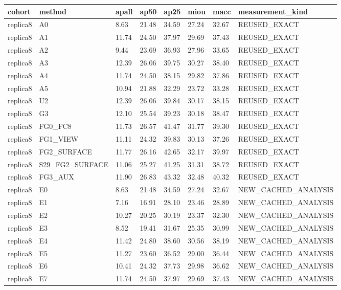 \begin{tabular}{llllllll}
\toprule
cohort & method & apall & ap50 & ap25 & miou & macc & measurement\_kind \\
\midrule
replica8 & A0 & 8.63 & 21.48 & 34.59 & 27.24 & 32.67 & REUSED\_EXACT \\
replica8 & A1 & 11.74 & 24.50 & 37.97 & 29.69 & 37.43 & REUSED\_EXACT \\
replica8 & A2 & 9.44 & 23.69 & 36.93 & 27.96 & 33.65 & REUSED\_EXACT \\
replica8 & A3 & 12.39 & 26.06 & 39.75 & 30.27 & 38.40 & REUSED\_EXACT \\
replica8 & A4 & 11.74 & 24.50 & 38.15 & 29.82 & 37.86 & REUSED\_EXACT \\
replica8 & A5 & 10.94 & 21.88 & 32.29 & 23.72 & 33.28 & REUSED\_EXACT \\
replica8 & U2 & 12.39 & 26.06 & 39.84 & 30.17 & 38.15 & REUSED\_EXACT \\
replica8 & G3 & 12.10 & 25.54 & 39.23 & 30.18 & 38.47 & REUSED\_EXACT \\
replica8 & FG0\_FC8 & 11.73 & 26.57 & 41.47 & 31.77 & 39.30 & REUSED\_EXACT \\
replica8 & FG1\_VIEW & 11.11 & 24.32 & 39.83 & 30.13 & 37.26 & REUSED\_EXACT \\
replica8 & FG2\_SURFACE & 11.77 & 26.16 & 42.65 & 32.17 & 39.97 & REUSED\_EXACT \\
replica8 & S29\_FG2\_SURFACE & 11.06 & 25.27 & 41.25 & 31.31 & 38.72 & REUSED\_EXACT \\
replica8 & FG3\_AUX & 11.90 & 26.83 & 43.32 & 32.48 & 40.32 & REUSED\_EXACT \\
replica8 & E0 & 8.63 & 21.48 & 34.59 & 27.24 & 32.67 & NEW\_CACHED\_ANALYSIS \\
replica8 & E1 & 7.16 & 16.91 & 28.10 & 23.46 & 28.89 & NEW\_CACHED\_ANALYSIS \\
replica8 & E2 & 10.27 & 20.25 & 30.19 & 23.37 & 32.30 & NEW\_CACHED\_ANALYSIS \\
replica8 & E3 & 8.52 & 19.41 & 31.67 & 25.35 & 30.99 & NEW\_CACHED\_ANALYSIS \\
replica8 & E4 & 11.42 & 24.80 & 38.60 & 30.56 & 38.19 & NEW\_CACHED\_ANALYSIS \\
replica8 & E5 & 11.27 & 23.60 & 36.52 & 29.00 & 36.44 & NEW\_CACHED\_ANALYSIS \\
replica8 & E6 & 10.41 & 24.32 & 37.73 & 29.98 & 36.62 & NEW\_CACHED\_ANALYSIS \\
replica8 & E7 & 11.74 & 24.50 & 37.97 & 29.69 & 37.43 & NEW\_CACHED\_ANALYSIS \\

\end{tabular}
